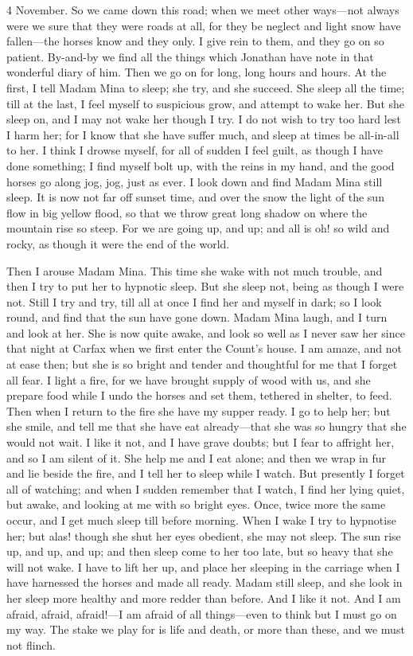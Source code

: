\begin{diary}{4 November.}
So we came down this road; when we meet other ways—not always were we sure that they were roads at all, for they be neglect and light snow have fallen—the horses know and they only. I give rein to them, and they go on so patient. By-and-by we find all the things which Jonathan have note in that wonderful diary of him. Then we go on for long, long hours and hours. At the first, I tell Madam Mina to sleep; she try, and she succeed. She sleep all the time; till at the last, I feel myself to suspicious grow, and attempt to wake her. But she sleep on, and I may not wake her though I try. I do not wish to try too hard lest I harm her; for I know that she have suffer much, and sleep at times be all-in-all to her. I think I drowse myself, for all of sudden I feel guilt, as though I have done something; I find myself bolt up, with the reins in my hand, and the good horses go along jog, jog, just as ever. I look down and find Madam Mina still sleep. It is now not far off sunset time, and over the snow the light of the sun flow in big yellow flood, so that we throw great long shadow on where the mountain rise so steep. For we are going up, and up; and all is oh! so wild and rocky, as though it were the end of the world.

Then I arouse Madam Mina. This time she wake with not much trouble, and then I try to put her to hypnotic sleep. But she sleep not, being as though I were not. Still I try and try, till all at once I find her and myself in dark; so I look round, and find that the sun have gone down. Madam Mina laugh, and I turn and look at her. She is now quite awake, and look so well as I never saw her since that night at Carfax when we first enter the Count's house. I am amaze, and not at ease then; but she is so bright and tender and thoughtful for me that I forget all fear. I light a fire, for we have brought supply of wood with us, and she prepare food while I undo the horses and set them, tethered in shelter, to feed. Then when I return to the fire she have my supper ready. I go to help her; but she smile, and tell me that she have eat already—that she was so hungry that she would not wait. I like it not, and I have grave doubts; but I fear to affright her, and so I am silent of it. She help me and I eat alone; and then we wrap in fur and lie beside the fire, and I tell her to sleep while I watch. But presently I forget all of watching; and when I sudden remember that I watch, I find her lying quiet, but awake, and looking at me with so bright eyes. Once, twice more the same occur, and I get much sleep till before morning. When I wake I try to hypnotise her; but alas! though she shut her eyes obedient, she may not sleep. The sun rise up, and up, and up; and then sleep come to her too late, but so heavy that she will not wake. I have to lift her up, and place her sleeping in the carriage when I have harnessed the horses and made all ready. Madam still sleep, and she look in her sleep more healthy and more redder than before. And I like it not. And I am afraid, afraid, afraid!—I am afraid of all things—even to think but I must go on my way. The stake we play for is life and death, or more than these, and we must not flinch.
	\end{diary}


